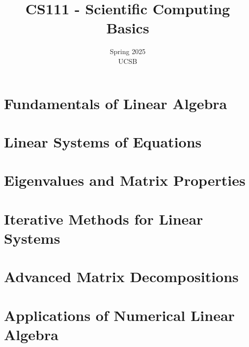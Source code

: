 \documentclass[12pt]{article} %
\title{CS111 - Scientific Computing Basics}
\date{Spring 2025 \\ \vskip 100pt UCSB}
\begin{document}
    \maketitle
    \tableofcontents
    \newpage
    
    \section{Fundamentals of Linear Algebra}
    
    
    
    \section{Linear Systems of Equations}
    
    
    
    
    \section{Eigenvalues and Matrix Properties}
    
    
    
    
    \section{Iterative Methods for Linear Systems}
    
    
    
    
    
    \section{Advanced Matrix Decompositions}
    
    
    
    
    \section{Applications of Numerical Linear Algebra}
    
    
\end{document}
